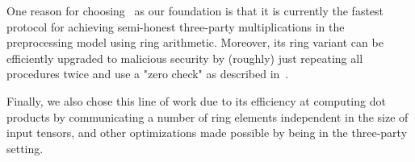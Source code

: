 
One reason for choosing~\cite{CCS:AFLNO16} as our foundation is that it is currently the fastest protocol for achieving semi-honest three-party multiplications in the preprocessing model using ring arithmetic.
%
Moreover, its ring variant can be efficiently upgraded to malicious security by (roughly) just repeating all procedures twice and use a "zero check" as described in~\cite{cryptoeprint:2020:1330}.

Finally, we also chose this line of work due to its efficiency at computing dot products by communicating a number of ring elements independent in the size of input tensors, and other optimizations made possible by being in the three-party setting.


